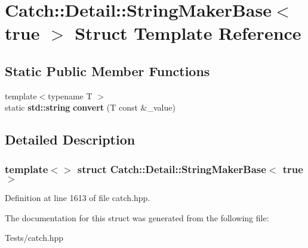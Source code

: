 \hypertarget{struct_catch_1_1_detail_1_1_string_maker_base_3_01true_01_4}{}\section{Catch\+:\+:Detail\+:\+:String\+Maker\+Base$<$ true $>$ Struct Template Reference}
\label{struct_catch_1_1_detail_1_1_string_maker_base_3_01true_01_4}
\subsection*{Static Public Member Functions}
\begin{DoxyCompactItemize}
\item 
\mbox{\label{struct_catch_1_1_detail_1_1_string_maker_base_3_01true_01_4_af9b5fdf7fddd8c5c873caa819e5f00f6}} 
{\footnotesize template$<$typename T $>$ }\\static \textbf{ std\+::string} {\bfseries convert} (T const \&\+\_\+value)
\end{DoxyCompactItemize}


\subsection{Detailed Description}
\subsubsection*{template$<$$>$\newline
struct Catch\+::\+Detail\+::\+String\+Maker\+Base$<$ true $>$}



Definition at line 1613 of file catch.\+hpp.



The documentation for this struct was generated from the following file\+:\begin{DoxyCompactItemize}
\item 
Tests/catch.\+hpp\end{DoxyCompactItemize}
